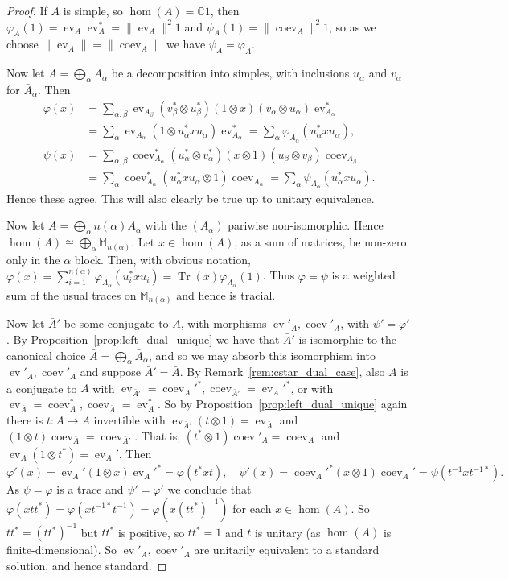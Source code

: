 \documentclass[a4paper,11pt]{article}
\theoremstyle{plain}
\theoremstyle{remark}
\newcommand{\Tr}{{\operatorname{Tr}}}
\newcommand{\ev}{\operatorname{ev}}
\newcommand{\coev}{\operatorname{coev}}
\newcommand{\conj}[1]{\bar{#1}}
\begin{document}
\begin{proof}
If $A$ is simple, so $\hom(A)=\mathbb C1$, then $\varphi_A(1) = \ev_A \ev_A^* = \|\ev_A\|^2 1$ and $\psi_A(1) = \|\coev_A\|^2 1$, so as we choose $\|\ev_A\| = \|\coev_A\|$ we have $\psi_A = \varphi_A$.

Now let $A = \bigoplus_\alpha A_\alpha$ be a decomposition into simples, with inclusions $u_\alpha$ and $v_\alpha$ for $\conj A_\alpha$.  Then
\begin{align*}
\varphi(x) &= \sum_{\alpha,\beta} \ev_{A_\beta} (v_\beta^* \otimes u_\beta^*) (1\otimes x) (v_\alpha\otimes u_\alpha) \ev_{A_\alpha}^* \\
&= \sum_\alpha \ev_{A_\alpha} (1\otimes u_\alpha^* x u_\alpha) \ev_{A_\alpha}^*
= \sum_\alpha \varphi_{A_\alpha}( u_\alpha ^* x u_\alpha ), \\
\psi(x) &= \sum_{\alpha,\beta} \coev_{A_\alpha}^* (u_\alpha^*\otimes v_\alpha^*) (x\otimes 1) (u_\beta\otimes v_\beta) \coev_{A_\beta} \\
&= \sum_\alpha \coev_{A_\alpha}^* (u_\alpha^* x u_\alpha \otimes 1) \coev_{A_\alpha}
= \sum_\alpha \psi_{A_\alpha}( u_\alpha ^* x u_\alpha ).
\end{align*}
Hence these agree.  This will also clearly be true up to unitary equivalence.

Now let $A = \bigoplus_\alpha n(\alpha) A_\alpha$ with the $(A_\alpha)$ pariwise non-isomorphic.  Hence $\hom(A) \cong \bigoplus_\alpha \mathbb M_{n(\alpha)}$.  Let $x\in\hom(A)$, as a sum of matrices, be non-zero only in the $\alpha$ block.  Then, with obvious notation, $\varphi(x) = \sum_{i=1}^{n(\alpha)} \varphi_{A_\alpha}(u_i^* x u_i) = \Tr(x) \varphi_{A_\alpha}(1)$.  Thus $\varphi=\psi$ is a weighted sum of the usual traces on $\mathbb M_{n(\alpha)}$ and hence is tracial.

Now let $\conj A'$ be some conjugate to $A$, with morphisms $\ev'_A, \coev'_A$, with $\psi' = \varphi'$. By Proposition~\ref{prop:left_dual_unique} we have that $\conj A'$ is isomorphic to the canonical choice $\conj A = \bigoplus_\alpha \conj A_\alpha$, and so we may absorb this isomorphism into $\ev'_A, \coev'_A$ and suppose $\conj A'=\conj A$.  By Remark~\ref{rem:cstar_dual_case}, also $A$ is a conjugate to $\conj A$ with $\ev_{\conj A'} = \coev_A'^*, \coev_{\conj A'} = \ev_A'^*$, or with $\ev_{\conj A}=\coev_A^*, \coev_{\conj A}=\ev_A^*$.  So by Proposition~\ref{prop:left_dual_unique} again there is $t\colon A\to A$ invertible with $\ev_{\conj A'}(t\otimes 1) = \ev_{\conj A}$ and $(1\otimes t)\coev_{\conj A} = \coev_{\conj A'}$.  That is, $(t^*\otimes 1) \coev'_A = \coev_A$ and $\ev_A (1\otimes t^*) = \ev_A'$.  Then
\[ \varphi'(x) = \ev_A'(1\otimes x) \ev_A'^* = \varphi(t^*xt), \quad
\psi'(x) = \coev_A'^*(x\otimes 1)\coev_A'
= \psi(t^{-1}x t^{-1 *}). \]
As $\psi = \varphi$ is a trace and $\psi'=\varphi'$ we conclude that $\varphi(xtt^*) = \varphi(xt^{-1*}t^{-1}) = \varphi(x(tt^*)^{-1})$ for each $x\in\hom(A)$.  So $tt^* = (tt^*)^{-1}$ but $tt^*$ is positive, so $tt^*=1$ and $t$ is unitary (as $\hom(A)$ is finite-dimensional).  So $\ev'_A, \coev'_A$ are unitarily equivalent to a standard solution, and hence standard.
\end{proof}
\end{document}
